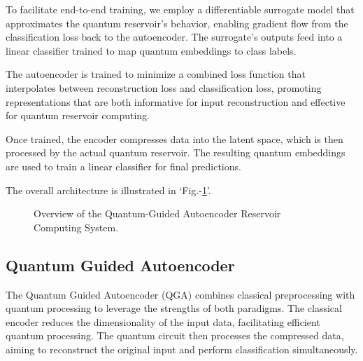 \documentclass[conference]{IEEEtran}
\begin{document}
To facilitate end-to-end training, we employ a differentiable 
surrogate model that approximates the quantum reservoir's 
behavior, enabling gradient flow from the classification 
loss back to the autoencoder. The surrogate's outputs feed 
into a linear classifier trained to map quantum embeddings to class labels.

The autoencoder is trained to minimize a combined loss 
function that interpolates between reconstruction loss and 
classification loss, promoting representations that are both 
informative for input reconstruction and effective for quantum 
reservoir computing.

Once trained, the encoder compresses data into the latent 
space, which is then processed by the actual quantum reservoir. 
The resulting quantum embeddings are used to train a linear 
classifier for final predictions.

The overall architecture is illustrated in `Fig.-\ref{fig:qgars_pipeline}'.

\begin{figure}[!h]
    \centering
    \label{fig:qgars_pipeline}
    \caption{Overview of the Quantum-Guided Autoencoder Reservoir Computing System.}
\end{figure}

\subsection{Quantum Guided Autoencoder}
The Quantum Guided Autoencoder (QGA) combines classical 
preprocessing with quantum processing to leverage 
the strengths of both paradigms. The classical encoder 
reduces the dimensionality of the input data, facilitating 
efficient quantum processing. The quantum circuit 
then processes the compressed data, aiming to reconstruct 
the original input and perform classification simultaneously.
\end{document}
